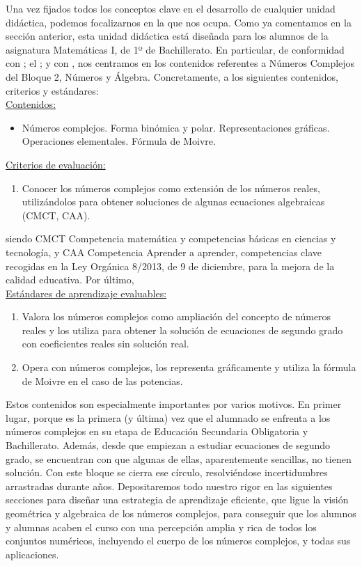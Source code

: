 \documentclass[../main.tex]{book}
\begin{document}
Una vez fijados todos los conceptos clave en el desarrollo de cualquier unidad didáctica, podemos focalizarnos en la que nos ocupa. Como ya comentamos en la sección anterior, esta unidad didáctica está diseñada para los alumnos de la asignatura Matemáticas I, de 1º de Bachillerato. En particular, de conformidad con \cite{orden1462016}; el \cite{decreto110}; y con \cite{RD1105}, nos centramos en los contenidos referentes a Números Complejos del Bloque 2, Números y Álgebra. Concretamente, a los siguientes contenidos, criterios y estándares: \\


\underline{Contenidos:}

\begin{itemize}
	\item Números complejos. Forma binómica y polar. Representaciones gráficas. Operaciones elementales. Fórmula de Moivre.
\end{itemize}

\underline{Criterios de evaluación:}

\begin{enumerate}
	\item Conocer los números complejos como extensión de los números reales, utilizándolos para obtener soluciones de algunas ecuaciones algebraicas (CMCT, CAA).
\end{enumerate}

siendo CMCT Competencia matemática y competencias básicas en ciencias y tecnología, y CAA Competencia Aprender a aprender, competencias clave recogidas en la Ley Orgánica 8/2013, de 9 de diciembre, para la mejora de la calidad educativa. Por último, \\

\underline{Estándares de aprendizaje evaluables:}

\begin{enumerate}
	\item Valora los números complejos como ampliación del concepto de números reales y los utiliza para obtener la solución de ecuaciones de segundo grado con coeficientes reales sin solución real.
	\item Opera con números complejos, los representa gráficamente y utiliza la fórmula de Moivre en el caso de las potencias.
\end{enumerate}


Estos contenidos son especialmente importantes por varios motivos. En primer lugar, porque es la primera (y última) vez que el alumnado se enfrenta a los números complejos en su etapa de Educación Secundaria Obligatoria y Bachillerato. Además, desde que empiezan a estudiar ecuaciones de segundo grado, se encuentran con que algunas de ellas, aparentemente sencillas, no tienen solución. Con este bloque se cierra ese círculo, resolviéndose incertidumbres arrastradas durante años. Depositaremos todo nuestro rigor en las siguientes secciones para diseñar una estrategia de aprendizaje eficiente, que ligue la visión geométrica y algebraica de los números complejos, para conseguir que los alumnos y alumnas acaben el curso con una percepción amplia y rica de todos los conjuntos numéricos, incluyendo el cuerpo de los números complejos, y todas sus aplicaciones.
\end{document}
